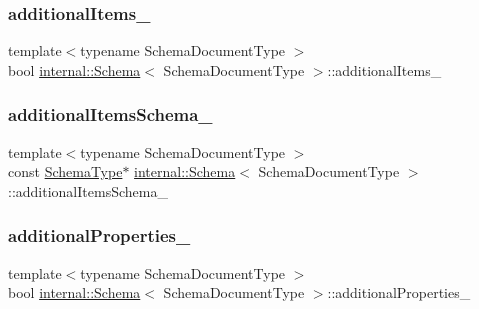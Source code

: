 \subsubsection{\texorpdfstring{additional\+Items\+\_\+}{additionalItems\_}}
{\footnotesize\ttfamily template$<$typename Schema\+Document\+Type $>$ \\
bool \hyperlink{classinternal_1_1Schema}{internal\+::\+Schema}$<$ Schema\+Document\+Type $>$\+::additional\+Items\+\_\+\hspace{0.3cm}{\ttfamily [private]}}

\mbox{\label{classinternal_1_1Schema_a89b93a67c2038b6211a44f9f87acce67}} 
\subsubsection{\texorpdfstring{additional\+Items\+Schema\+\_\+}{additionalItemsSchema\_}}
{\footnotesize\ttfamily template$<$typename Schema\+Document\+Type $>$ \\
const \hyperlink{classinternal_1_1Schema_ac2556ebf7a7db971e1c1c0f76eb5786e}{Schema\+Type}$\ast$ \hyperlink{classinternal_1_1Schema}{internal\+::\+Schema}$<$ Schema\+Document\+Type $>$\+::additional\+Items\+Schema\+\_\+\hspace{0.3cm}{\ttfamily [private]}}

\mbox{\label{classinternal_1_1Schema_a1aa6a6276158b7b41e8a2aa553d701be}} 
\subsubsection{\texorpdfstring{additional\+Properties\+\_\+}{additionalProperties\_}}
{\footnotesize\ttfamily template$<$typename Schema\+Document\+Type $>$ \\
bool \hyperlink{classinternal_1_1Schema}{internal\+::\+Schema}$<$ Schema\+Document\+Type $>$\+::additional\+Properties\+\_\+\hspace{0.3cm}{\ttfamily [private]}}

